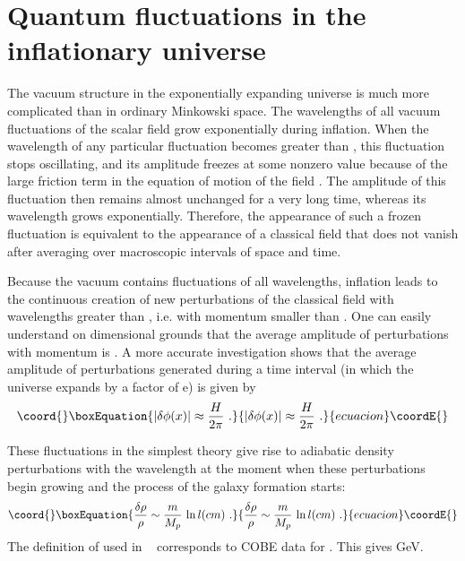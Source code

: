 \documentclass[a4paper,12pt]{article}
\begin{document}
\section{\label{s7.3}Quantum fluctuations in the inflationary universe}

The vacuum structure in the  exponentially expanding universe  is much
more complicated than in ordinary Minkowski space.
 The wavelengths of all vacuum
fluctuations of the scalar field \myHighlight{$\phi$}\coordHE{} grow exponentially during
inflation. When the wavelength of any particular fluctuation becomes
greater than \coordHE{}, this fluctuation stops oscillating, and its
amplitude freezes at some nonzero value \coordHE{} because of the
large friction term \coordHE{} in the equation of motion of the field
\myHighlight{$\phi$}\coordHE{}\@. The amplitude of this fluctuation then remains almost unchanged
for a very long time, whereas its wavelength grows exponentially.
Therefore, the appearance of such a frozen fluctuation is equivalent to
the appearance of a classical field \coordHE{} that does not vanish
after averaging over macroscopic intervals of space and time.

Because the vacuum contains fluctuations of all wavelengths, inflation
leads to the continuous creation of  new perturbations of the classical
field with wavelengths greater than \coordHE{}, i.e. with momentum \coordHE{}
smaller than \coordHE{}. One can easily understand  on dimensional grounds that the average amplitude of
 perturbations with momentum \coordHE{} is \coordHE{}. A more accurate
investigation shows that the average amplitude of perturbations generated during a time interval \coordHE{}
(in which the universe expands by a factor of e) is given by~\cite{FordVil,book}
\begin{equation}\coord{}\boxEquation{\label{E23}
|\delta\phi(x)| \approx \frac{H}{2\pi}\ .
}{|\delta\phi(x)| \approx \frac{H}{2\pi}\ .
}{ecuacion}\coordE{}\end{equation}


These fluctuations in the simplest theory \coordHE{} give rise to adiabatic density perturbations with the wavelength
\coordHE{} at the moment when these perturbations begin growing and the
process of the galaxy formation starts:
\begin{equation}\coord{}\boxEquation{\label{E26}
\frac{\delta \rho}{\rho} \sim   {m\over M_p}\,  \ln l(cm)\ .
}{\frac{\delta \rho}{\rho} \sim   {m\over M_p}\,  \ln l(cm)\ .
}{ecuacion}\coordE{}\end{equation}
The definition of  \myHighlight{${\delta\rho\over \rho}$}\coordHE{} used in  ~\cite{book}
corresponds to COBE data for  \coordHE{}. This gives \coordHE{} GeV.
\end{document}
